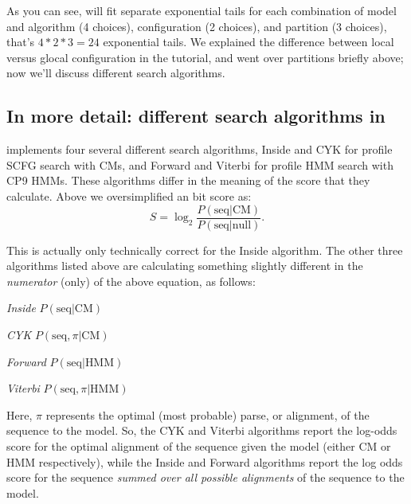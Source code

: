 As you can see,  will fit separate exponential tails
for each combination of model and algorithm (4 choices), configuration
(2 choices), and partition (3 choices), that's $4*2*3=24$ exponential
tails. We explained the difference between local versus glocal
configuration in the tutorial, and went over partitions briefly above;
now we'll discuss different search algorithms. 

\subsection{In more detail: different search algorithms in }
 implements four several different search 
algorithms, Inside and CYK for profile SCFG search with CMs, and
Forward and Viterbi for profile HMM search with CP9 HMMs.
These algorithms
differ in the meaning of the score that they calculate. Above we
oversimplified an  bit score as:
\[
	S = \log_2 \frac {P( \mbox{seq} | \mbox{CM})} { P (\mbox{seq} |
	\mbox{null})}.
\]

This is actually only technically correct for the Inside
algorithm. The other three algorithms listed above are calculating
something slightly different in the \emph{numerator} (only) of the
above equation, as follows: 

\begin{wideitem}
\item[\em{Inside}]  $P(\mbox{seq}      | \mbox{CM})$
\item[\em{CYK}]     $P(\mbox{seq},\pi  | \mbox{CM})$
\item[\em{Forward}] $P(\mbox{seq}      | \mbox{HMM})$
\item[\em{Viterbi}] $P(\mbox{seq},\pi  | \mbox{HMM})$
\end{wideitem}

Here, $\pi$ represents the optimal (most probable) parse, or
alignment, of the sequence to the model. So, the CYK and Viterbi
algorithms report the log-odds score for the optimal alignment 
of the sequence given the model (either CM or HMM respectively), while
the Inside and Forward algorithms report the log odds score for the
sequence \emph{summed over all possible alignments} of the sequence to
the model. 

